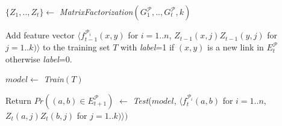 \begin{algorithm}[t]
\begin{algorithmic}[1]
\STATE $\{Z_1, .., Z_t\} \leftarrow$ \textit{MatrixFactorization}$(G^\mathcal{P}_1, .., G^\mathcal{P}_t, k)$



\STATE Add feature vector $\langle$$f^{\mathcal{P}_i}_{t-1}(x,y)$ for $i=1..n$, $Z_{t-1}(x,j)Z_{t-1}(y,j)$ for $j=1..k)\rangle$ to the training set $T$ with \textit{label}=1 if $(x,y)$ is a new link in $E^\mathcal{P}_{t}$ otherwise \textit{label}=0.


\ENDFOR

\STATE $model \leftarrow$ \textit{Train}$(T)$

\STATE Return $Pr((a,b)\in E^\mathcal{P}_{t+1})$ $\leftarrow$ \textit{Test}($model$, $\langle$$f^{\mathcal{P}_i}_{t}(a,b)$ for $i=1..n$, $Z_t(a,j)Z_t(b,j)$ for $j=1..k)\rangle)$

\end{algorithmic}
\end{algorithm}



